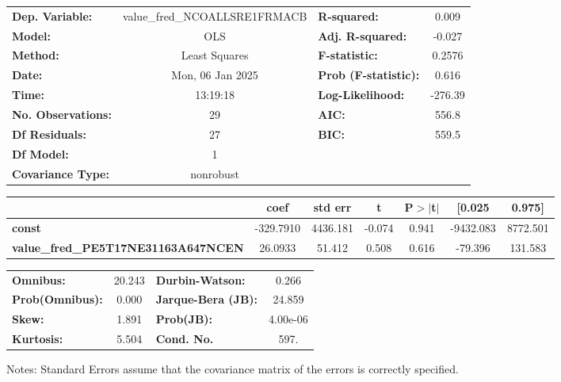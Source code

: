 \begin{center}
\begin{tabular}{lclc}
\toprule
\textbf{Dep. Variable:}                     & value\_fred\_NCOALLSRE1FRMACB & \textbf{  R-squared:         } &     0.009   \\
\textbf{Model:}                             &              OLS              & \textbf{  Adj. R-squared:    } &    -0.027   \\
\textbf{Method:}                            &         Least Squares         & \textbf{  F-statistic:       } &    0.2576   \\
\textbf{Date:}                              &        Mon, 06 Jan 2025       & \textbf{  Prob (F-statistic):} &    0.616    \\
\textbf{Time:}                              &            13:19:18           & \textbf{  Log-Likelihood:    } &   -276.39   \\
\textbf{No. Observations:}                  &                 29            & \textbf{  AIC:               } &     556.8   \\
\textbf{Df Residuals:}                      &                 27            & \textbf{  BIC:               } &     559.5   \\
\textbf{Df Model:}                          &                  1            & \textbf{                     } &             \\
\textbf{Covariance Type:}                   &           nonrobust           & \textbf{                     } &             \\
\bottomrule
\end{tabular}
\begin{tabular}{lcccccc}
                                            & \textbf{coef} & \textbf{std err} & \textbf{t} & \textbf{P$> |$t$|$} & \textbf{[0.025} & \textbf{0.975]}  \\
\midrule
\textbf{const}                              &    -329.7910  &     4436.181     &    -0.074  &         0.941        &    -9432.083    &     8772.501     \\
\textbf{value\_fred\_PE5T17NE31163A647NCEN} &      26.0933  &       51.412     &     0.508  &         0.616        &      -79.396    &      131.583     \\
\bottomrule
\end{tabular}
\begin{tabular}{lclc}
\textbf{Omnibus:}       & 20.243 & \textbf{  Durbin-Watson:     } &    0.266  \\
\textbf{Prob(Omnibus):} &  0.000 & \textbf{  Jarque-Bera (JB):  } &   24.859  \\
\textbf{Skew:}          &  1.891 & \textbf{  Prob(JB):          } & 4.00e-06  \\
\textbf{Kurtosis:}      &  5.504 & \textbf{  Cond. No.          } &     597.  \\
\bottomrule
\end{tabular}
\end{center}

Notes: \newline
 [1] Standard Errors assume that the covariance matrix of the errors is correctly specified.